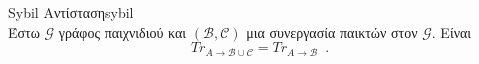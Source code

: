 {}
\begin{theoremgr}{\textlatin{Sybil} Αντίσταση}{sybil} \ \\
  Έστω $\mathcal{G}$ γράφος παιχνιδιού και $\left(\mathcal{B}, \mathcal{C}\right)$ μια συνεργασία παικτών στον $\mathcal{G}$.
  Είναι
  \begin{equation*}
     Tr_{A \rightarrow \mathcal{B} \cup \mathcal{C}} = Tr_{A \rightarrow \mathcal{B}} \enspace.
  \end{equation*}
\end{theoremgr}
